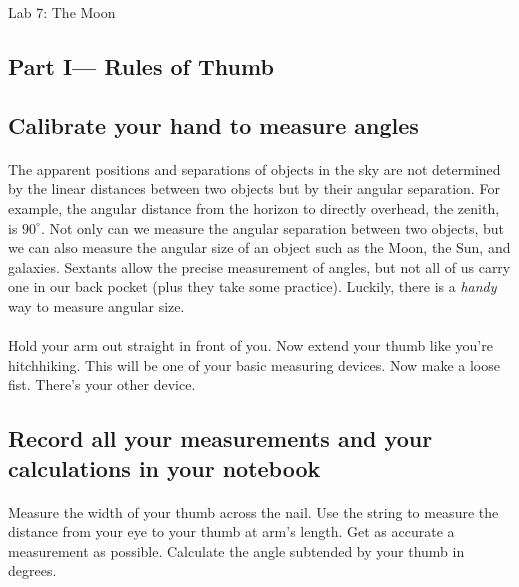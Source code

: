 \documentclass[10pt]{article}
\begin{document}
\begin{center}
{\Huge Lab 7: The Moon}   %
\end{center}

\begin{flushleft}
\vspace{0.3in}
\section*{Part I--- Rules of Thumb}
\subsection*{Calibrate your hand to measure angles}
\vspace{0.1in}
\paragraph{}
The apparent positions and separations of objects in the sky are not determined by the linear distances between two objects but by their angular separation. For example, the angular distance from the horizon to directly overhead, the zenith, is $90^\circ$. Not only can we measure the angular separation between two objects, but we can also measure the angular size of an object such as the Moon, the Sun, and galaxies. Sextants allow the precise measurement of angles, but not all of us carry one in our back pocket (plus they take some practice). Luckily, there is a \textsl{handy} way to measure angular size. 

\paragraph{}
Hold your arm out straight in front of you. Now extend your thumb like you're hitchhiking. This will be one of your basic measuring devices. Now make a loose fist. There's your other device.

\vspace{0.2in}
\subsection*{Record all your measurements and your calculations in your notebook}

\paragraph{}
Measure the width of your thumb across the nail. Use the string to
measure the distance from your eye to your thumb at arm's length. Get
as accurate a measurement as possible. Calculate the angle subtended by your thumb in
degrees.


\end{flushleft}
\end{document}
